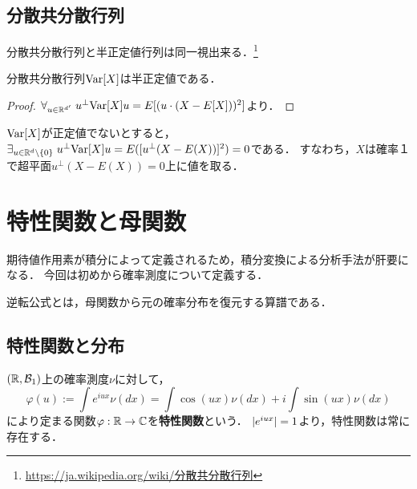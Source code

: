 \documentclass[uplatex,dvipdfmx]{jsreport}
\begin{document}
\subsection{分散共分散行列}

\begin{tcolorbox}[colframe=ForestGreen, colback=ForestGreen!10!white,breakable,colbacktitle=ForestGreen!40!white,coltitle=black,fonttitle=\bfseries\sffamily,
title=]
    分散共分散行列と半正定値行列は同一視出来る．\footnote{\url{https://ja.wikipedia.org/wiki/分散共分散行列}}
\end{tcolorbox}

\begin{lemma}
    分散共分散行列$\mathrm{Var}[X]$は半正定値である．
\end{lemma}
\begin{proof}
    $\forall_{u\in\mathbb{R}^{d'}}\;u^\perp\mathrm{Var}[X]u=E[(u\cdot(X-E[X]))^2]$より．
\end{proof}
\begin{remark}[退化した多次元確率変数]
    $\mathrm{Var}[X]$が正定値でないとすると，$\exists_{u\in\mathbb{R}^d\setminus\{0\}}\;u^\perp\mathrm{Var}[X]u=E([u^\perp(X-E(X))]^2)=0$である．
    すなわち，$X$は確率１で超平面$u^\perp(X-E(X))=0$上に値を取る．
\end{remark}

\section{特性関数と母関数}

\begin{tcolorbox}[colframe=ForestGreen, colback=ForestGreen!10!white,breakable,colbacktitle=ForestGreen!40!white,coltitle=black,fonttitle=\bfseries\sffamily,
title=積分変換]
    期待値作用素が積分によって定義されるため，積分変換による分析手法が肝要になる．
    今回は初めから確率測度について定義する．

    逆転公式とは，母関数から元の確率分布を復元する算譜である．
\end{tcolorbox}

\subsection{特性関数と分布}

\begin{definition}
    $(\mathbb{R},\mathcal{B}_1)$上の確率測度$\nu$に対して，
    \[\varphi(u):=\int e^{iux}\nu(dx)=\int\cos(ux)\nu(dx)+i\int\sin(ux)\nu(dx)\]
    により定まる関数$\varphi:\mathbb{R}\to\mathbb{C}$を\textbf{特性関数}という．
    $\lvert e^{iux}\rvert=1$より，特性関数は常に存在する．
\end{definition}
\end{document}
